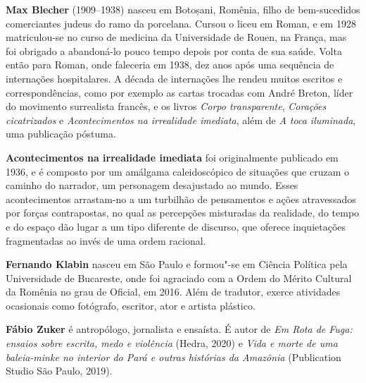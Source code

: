 \textbf{Max Blecher} (1909--1938) nasceu em Botoșani, Romênia, filho de bem-sucedidos comerciantes judeus do ramo da porcelana. Cursou o liceu em Roman, e em 1928 matriculou-se no curso de medicina da Universidade de Rouen, na França, mas foi obrigado a abandoná-lo pouco tempo depois por conta de sua saúde. Volta então para Roman, onde faleceria em 1938, dez anos após uma sequência de internações hospitalares. A década de internações lhe rendeu muitos escritos e correspondências, como por exemplo as cartas trocadas com André Breton, líder do movimento surrealista francês, e os livros \textit{Corpo transparente}, \textit{Corações cicatrizados} e \textit{Acontecimentos na irrealidade imediata}, além de \textit{A toca iluminada}, uma publicação póstuma.

\textbf{Acontecimentos na irrealidade imediata} foi originalmente publicado em 1936, e é composto por um amálgama caleidoscópico de situações que cruzam o caminho do narrador, um personagem desajustado ao mundo. Esses acontecimentos arrastam-no a um turbilhão de pensamentos e ações atravessados por forças contrapostas, no qual as percepções misturadas da realidade, do tempo e do espaço dão lugar a um tipo diferente de discurso, que oferece inquietações fragmentadas ao invés de uma ordem racional.

\textbf{Fernando Klabin} nasceu em São Paulo e formou"-se em Ciência Política pela Universidade de Bucareste, onde foi agraciado com a Ordem do Mérito Cultural da Romênia no grau de Oficial, em 2016. Além de tradutor, exerce atividades ocasionais como fotógrafo, escritor, ator e artista plástico.

\textbf{Fábio Zuker} é antropólogo, jornalista e ensaísta. É autor de \textit{Em Rota de Fuga: ensaios sobre escrita, medo e violência} (Hedra, 2020) e \textit{Vida e morte de uma baleia-minke no interior do Pará e outras histórias da Amazônia} (Publication Studio São Paulo, 2019).


